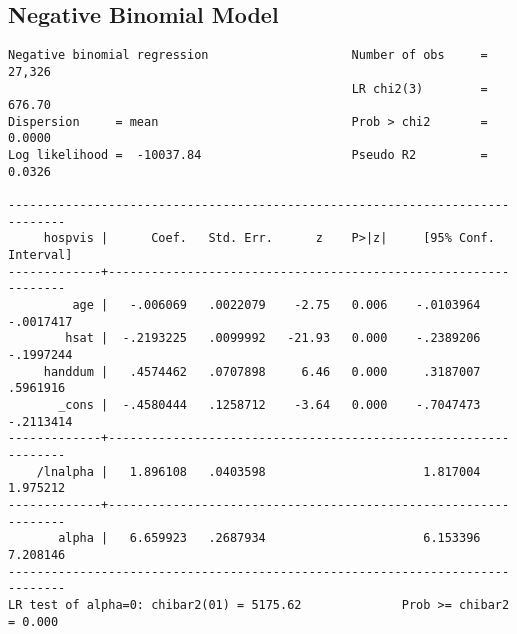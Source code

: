 \documentclass{article}
\begin{document}
\newpage
\hypertarget{nbreg}{\subsection*{Negative Binomial Model}}
\begin{verbatim}
Negative binomial regression                    Number of obs     =     27,326
                                                LR chi2(3)        =     676.70
Dispersion     = mean                           Prob > chi2       =     0.0000
Log likelihood =  -10037.84                     Pseudo R2         =     0.0326

------------------------------------------------------------------------------
     hospvis |      Coef.   Std. Err.      z    P>|z|     [95% Conf. Interval]
-------------+----------------------------------------------------------------
         age |   -.006069   .0022079    -2.75   0.006    -.0103964   -.0017417
        hsat |  -.2193225   .0099992   -21.93   0.000    -.2389206   -.1997244
     handdum |   .4574462   .0707898     6.46   0.000     .3187007    .5961916
       _cons |  -.4580444   .1258712    -3.64   0.000    -.7047473   -.2113414
-------------+----------------------------------------------------------------
    /lnalpha |   1.896108   .0403598                      1.817004    1.975212
-------------+----------------------------------------------------------------
       alpha |   6.659923   .2687934                      6.153396    7.208146
------------------------------------------------------------------------------
LR test of alpha=0: chibar2(01) = 5175.62              Prob >= chibar2 = 0.000
\end{verbatim}





\end{document}
